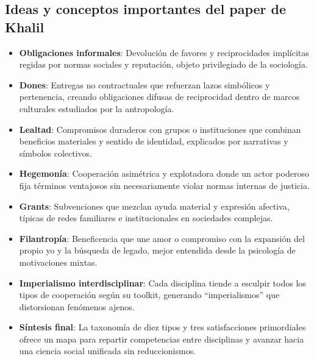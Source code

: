 \documentclass[a4paper,11pt]{article}
\begin{document}
\begin{seccionbox}[verdesuave]{\subsection*{Ideas y conceptos importantes del paper de Khalil}}
\begin{itemize}
        \item \textbf{Obligaciones informales}: Devolución de favores y reciprocidades implícitas regidas por normas sociales y reputación, objeto privilegiado de la sociología.
        \item \textbf{Dones}: Entregas no contractuales que refuerzan lazos simbólicos y pertenencia, creando obligaciones difusas de reciprocidad dentro de marcos culturales estudiados por la antropología.
        \item \textbf{Lealtad}: Compromisos duraderos con grupos o instituciones que combinan beneficios materiales y sentido de identidad, explicados por narrativas y símbolos colectivos.
        \item \textbf{Hegemonía}: Cooperación asimétrica y explotadora donde un actor poderoso fija términos ventajosos sin necesariamente violar normas internas de justicia.
        \item \textbf{Grants}: Subvenciones que mezclan ayuda material y expresión afectiva, típicas de redes familiares e institucionales en sociedades complejas.
        \item \textbf{Filantropía}: Beneficencia que une amor o compromiso con la expansión del propio yo y la búsqueda de legado, mejor entendida desde la psicología de motivaciones mixtas.
        \item \textbf{Imperialismo interdisciplinar}: Cada disciplina tiende a esculpir todos los tipos de cooperación según su toolkit, generando “imperialismos” que distorsionan fenómenos ajenos.
        \item \textbf{Síntesis final}: La taxonomía de diez tipos y tres satisfacciones primordiales ofrece un mapa para repartir competencias entre disciplinas y avanzar hacia una ciencia social unificada sin reduccionismos.
    \end{itemize}
 \end{seccionbox}
 
 
\end{document}
